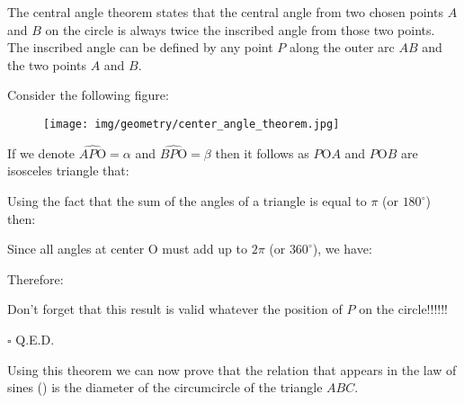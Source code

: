 	\begin{theorem}
	The central angle theorem states that the central angle from two chosen points $A$ and $B$ on the circle is always twice the inscribed angle from those two points. The inscribed angle can be defined by any point $P$ along the outer arc $AB$ and the two points $A$ and $B$.
	\end{theorem}

	\begin{dem}
	Consider the following figure:
	\begin{figure}[H]
		\centering
		\texttt{[image: img/geometry/center\_angle\_theorem.jpg]}
	\end{figure}
	If we denote $\widehat{AP\text{O}}=\alpha$ and $\widehat{BP\text{O}}=\beta$ then it follows as $P\text{O}A$ and $P\text{O}B$ are isosceles triangle that:
	
	Using the fact that the sum of the angles of a triangle is equal to $\pi$ (or $180^\circ$) then:
	
	Since all angles at center O must add up to $2\pi$ (or $360^\circ$), we have:
	
	Therefore:
	
	Don't forget that this result is valid whatever the position of $P$ on the circle!!!!!!
	\begin{flushright}
		$\square$  Q.E.D.
	\end{flushright}
	\end{dem}
	Using this theorem we can now prove that the relation that appears in the law of sines () is the diameter of the circumcircle of the triangle $ABC$.

